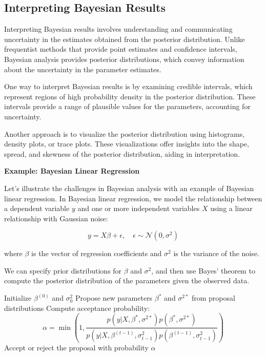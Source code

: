 \documentclass[12pt]{book} %
\begin{document}
\subsection{Interpreting Bayesian Results}

Interpreting Bayesian results involves understanding and communicating uncertainty in the estimates obtained from the posterior distribution. Unlike frequentist methods that provide point estimates and confidence intervals, Bayesian analysis provides posterior distributions, which convey information about the uncertainty in the parameter estimates.

One way to interpret Bayesian results is by examining credible intervals, which represent regions of high probability density in the posterior distribution. These intervals provide a range of plausible values for the parameters, accounting for uncertainty.

Another approach is to visualize the posterior distribution using histograms, density plots, or trace plots. These visualizations offer insights into the shape, spread, and skewness of the posterior distribution, aiding in interpretation.

\FloatBarrier
\textbf{Example: Bayesian Linear Regression}

Let's illustrate the challenges in Bayesian analysis with an example of Bayesian linear regression. In Bayesian linear regression, we model the relationship between a dependent variable \(y\) and one or more independent variables \(X\) using a linear relationship with Gaussian noise:

\[
y = X\beta + \epsilon, \quad \epsilon \sim \mathcal{N}(0, \sigma^2)
\]

where \(\beta\) is the vector of regression coefficients and \(\sigma^2\) is the variance of the noise.

We can specify prior distributions for \(\beta\) and \(\sigma^2\), and then use Bayes' theorem to compute the posterior distribution of the parameters given the observed data.
\FloatBarrier
\begin{algorithm}
\caption{Metropolis-Hastings Algorithm for Bayesian Linear Regression}
\begin{algorithmic}[1]
\State Initialize \(\beta^{(0)}\) and \(\sigma^2_0\)
    \State Propose new parameters \(\beta^*\) and \(\sigma^{2*}\) from proposal distributions
    \State Compute acceptance probability:
    \[
    \alpha = \min\left(1, \frac{{p(y|X, \beta^*, \sigma^{2*})p(\beta^*, \sigma^{2*})}}{{p(y|X, \beta^{(t-1)}, \sigma^2_{t-1})p(\beta^{(t-1)}, \sigma^2_{t-1})}}\right)
    \]
    \State Accept or reject the proposal with probability \(\alpha\)
\EndFor
\end{algorithmic}
\end{algorithm}
\FloatBarrier
\end{document}
